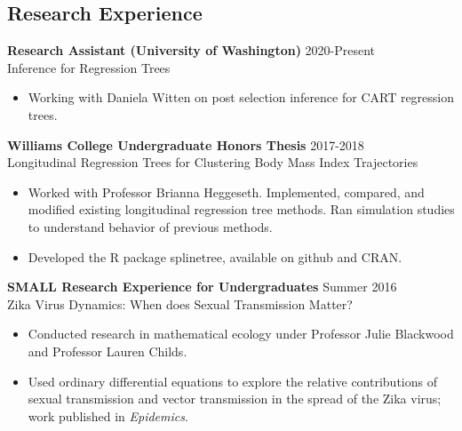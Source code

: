 \documentclass[margin, 10pt]{res} %
\begin{document}
\begin{resume}
 
\section{Research Experience}

{\textbf{Research Assistant (University of Washington)} \hfill 2020-Present  \\
Inference for Regression Trees
\begin{itemize}
\item Working with Daniela Witten on post selection inference for CART regression trees. 
\end{itemize} 

{\textbf{Williams College Undergraduate Honors Thesis}} \hfill 2017-2018  \\
Longitudinal Regression Trees for Clustering Body Mass Index Trajectories
\begin{itemize}
\item Worked with Professor Brianna Heggeseth. Implemented, compared, and modified existing longitudinal regression tree methods. Ran simulation studies to understand behavior of previous methods.  \item Developed the R package splinetree, available on github and CRAN. 
\end{itemize} 

{\textbf{SMALL Research Experience for Undergraduates}} \hfill Summer 2016 \\
Zika Virus Dynamics: When does Sexual Transmission Matter? 
\begin{itemize}
\item Conducted research in mathematical ecology under Professor Julie Blackwood and Professor Lauren Childs. 
\item Used ordinary differential equations to explore the relative contributions of sexual transmission and vector transmission in the spread of the Zika virus; work published in \textit{Epidemics}.  
\end{itemize} 


}
\end{resume}
\end{document}
